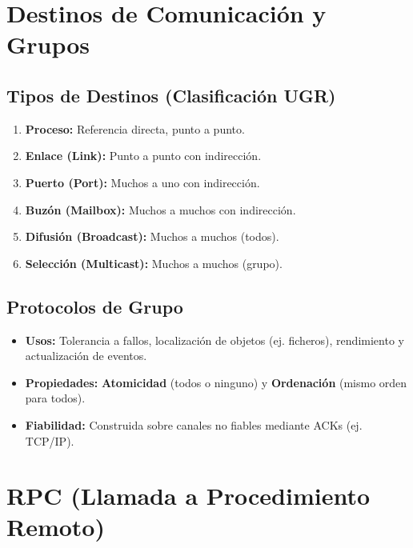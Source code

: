 \section{Destinos de Comunicación y Grupos}

\subsection{Tipos de Destinos (Clasificación UGR)}
\begin{enumerate}
    \item \textbf{Proceso:} Referencia directa, punto a punto.
    \item \textbf{Enlace (Link):} Punto a punto con indirección.
    \item \textbf{Puerto (Port):} Muchos a uno con indirección.
    \item \textbf{Buzón (Mailbox):} Muchos a muchos con indirección.
    \item \textbf{Difusión (Broadcast):} Muchos a muchos (todos).
    \item \textbf{Selección (Multicast):} Muchos a muchos (grupo).
\end{enumerate}



\subsection{Protocolos de Grupo}
\begin{itemize}
    \item \textbf{Usos:} Tolerancia a fallos, localización de objetos (ej. ficheros), rendimiento y actualización de eventos.
    \item \textbf{Propiedades:} \textbf{Atomicidad} (todos o ninguno) y \textbf{Ordenación} (mismo orden para todos).
    \item \textbf{Fiabilidad:} Construida sobre canales no fiables mediante ACKs (ej. TCP/IP).
\end{itemize}

\section{RPC (Llamada a Procedimiento Remoto)}

